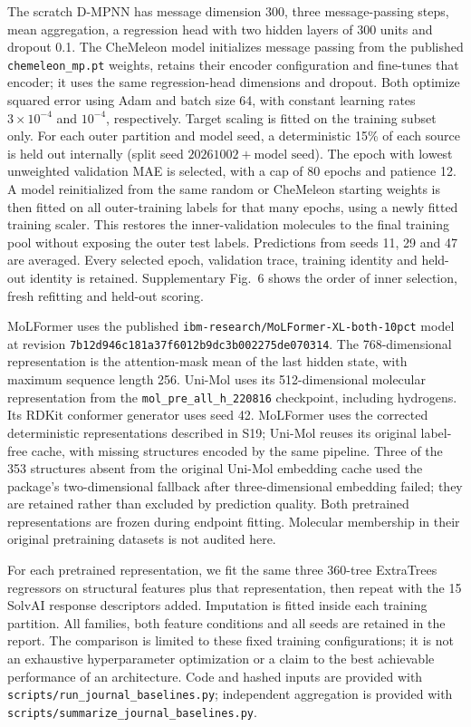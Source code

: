 The scratch D-MPNN has message dimension 300, three message-passing steps, mean
aggregation, a regression head with two hidden layers of 300 units and dropout 0.1. The CheMeleon
model initializes message passing from the published
\texttt{chemeleon\_mp.pt} weights, retains their encoder configuration and fine-tunes
that encoder; it uses the same regression-head dimensions and dropout.
Both optimize squared error using Adam and batch size 64, with constant learning
rates $3\times10^{-4}$ and $10^{-4}$, respectively. Target scaling is fitted on the
training subset only. For each outer partition and model seed, a deterministic 15\%
of each source is held out internally (split seed $20261002+\text{model seed}$).
The epoch with lowest unweighted validation MAE is selected, with a cap of 80 epochs
and patience 12. A model reinitialized from the same random or CheMeleon starting
weights is then fitted on all outer-training
labels for that many epochs, using a newly fitted training scaler. This restores
the inner-validation molecules to the final training pool without exposing the
outer test labels. Predictions from seeds 11, 29 and 47 are averaged. Every selected
epoch, validation trace, training identity and held-out identity is retained.
Supplementary Fig.~6 shows the order of inner selection, fresh refitting and
held-out scoring.

MoLFormer uses the published
\nolinkurl{ibm-research/MoLFormer-XL-both-10pct} model at revision
\nolinkurl{7b12d946c181a37f6012b9dc3b002275de070314}. The 768-dimensional representation
is the attention-mask mean of the last hidden state, with maximum sequence length
256. Uni-Mol uses its 512-dimensional molecular representation from the
\texttt{mol\_pre\_all\_h\_220816} checkpoint, including hydrogens. Its RDKit
conformer generator uses seed 42. MoLFormer uses the corrected deterministic
representations described in S19; Uni-Mol reuses its original label-free cache,
with missing structures encoded by the same pipeline. Three of the 353
structures absent from the original Uni-Mol embedding cache used the package's two-dimensional fallback after three-dimensional
embedding failed; they are retained rather than excluded by prediction quality.
Both pretrained representations are frozen during endpoint fitting. Molecular
membership in their original pretraining datasets is not audited here.

For each pretrained representation, we fit the same three 360-tree ExtraTrees
regressors on structural features plus that representation, then repeat with the
15 SolvAI response descriptors added. Imputation is fitted inside each training
partition. All families, both feature conditions and all seeds are retained in the
report. The comparison is limited to these fixed training configurations; it is
not an exhaustive hyperparameter optimization or a claim to the best achievable
performance of an architecture. Code and hashed inputs are provided with
\texttt{scripts/run\_journal\_baselines.py}; independent aggregation is provided
with \texttt{scripts/summarize\_journal\_baselines.py}.

